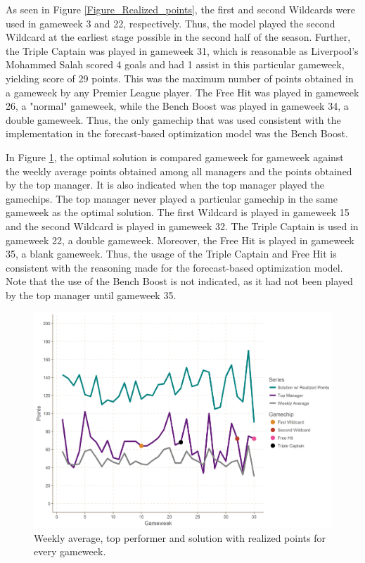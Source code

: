 As seen in Figure \ref{Figure_Realized_points}, the first and second Wildcards were used in gameweek 3 and 22, respectively. Thus, the model played the second Wildcard at the earliest stage possible in the second half of the season. Further, the Triple Captain was played in gameweek 31, which is reasonable as Liverpool's Mohammed Salah scored 4 goals and had 1 assist in this particular gameweek, yielding score of 29 points. This was the maximum number of points obtained in a gameweek by any Premier League player. The Free Hit was played in gameweek 26, a "normal" gameweek, while the Bench Boost was played in gameweek 34, a double gameweek. Thus, the only gamechip that was used consistent with the implementation in the forecast-based optimization model was the Bench Boost.

\newpar

In Figure \ref{Figure_Comparison}, the optimal solution is compared gameweek for gameweek against the weekly average points obtained among all managers and the points obtained by the top manager. It is also indicated when the top manager played the gamechips. The top manager never played a particular gamechip in the same gameweek as the optimal solution. The first Wildcard is played in gameweek 15 and the second Wildcard is played in gameweek 32. The Triple Captain is used in gameweek 22, a double gameweek. Moreover, the Free Hit is played in gameweek 35, a blank gameweek. Thus, the usage of the Triple Captain and Free Hit is consistent with the reasoning made for the forecast-based optimization model. Note that the use of the Bench Boost is not indicated, as it had not been played by the top manager until gameweek 35.

\begin{figure}[H]
\label{fig:Comparison}
    \centering
    \includegraphics[scale=0.5]{fig/chapter_7/perf_top_avg.png}
    \caption{Weekly average, top performer and solution with realized points for every gameweek.}
\label{Figure_Comparison}    
\end{figure}

